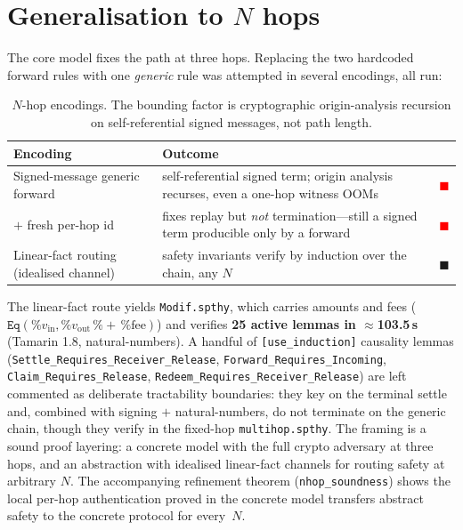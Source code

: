 \documentclass[11pt]{article}
\newcommand{\gc}{\textcolor{okgreen}{$\blacksquare$}}
\newcommand{\rc}{\textcolor{red}{$\blacksquare$}}
\begin{document}
\section{Generalisation to $N$ hops}

The core model fixes the path at three hops. Replacing the two hardcoded forward
rules with one \emph{generic} rule was attempted in several encodings, all run:

\begin{table}[h]
\centering
\small
\begin{tabular}{@{}p{4.9cm}p{7.4cm}c@{}}
\toprule
\textbf{Encoding} & \textbf{Outcome} & \\
\midrule
Signed-message generic forward & self-referential signed term; origin analysis recurses, even a one-hop witness OOMs & \rc \\
\;\; $+$ fresh per-hop id & fixes replay but \emph{not} termination---still a signed term producible only by a forward & \rc \\
Linear-fact routing (idealised channel) & safety invariants verify by induction over the chain, any $N$ & \gc \\
\bottomrule
\end{tabular}
\caption{$N$-hop encodings. The bounding factor is cryptographic
origin-analysis recursion on self-referential signed messages, not path length.}
\label{tab:nhop}
\end{table}

The linear-fact route yields \texttt{Modif.spthy}, which carries amounts
and fees ($\texttt{Eq}(\%v_\text{in},\%v_\text{out}\,\%{+}\,\%\text{fee})$) and
verifies \textbf{25 active lemmas in $\approx$103.5\,s} (Tamarin 1.8,
natural-numbers). A handful of \texttt{[use\_induction]} causality lemmas
(\texttt{Settle_Requires_Receiver_Release}, \texttt{Forward_Requires_Incoming},
\texttt{Claim_Requires_Release}, \texttt{Redeem_Requires_Receiver_Release}) are
left commented as deliberate tractability boundaries: they key on the terminal
settle and, combined with signing $+$ natural-numbers, do not terminate on the
generic chain, though they verify in the fixed-hop \texttt{multihop.spthy}. The
framing is a sound proof layering: a concrete model with the full crypto
adversary at three hops, and an abstraction with idealised linear-fact channels
for routing safety at arbitrary $N$. The accompanying refinement theorem
(\texttt{nhop_soundness}) shows the local per-hop authentication proved in the
concrete model transfers abstract safety to the concrete protocol for every~$N$.
\end{document}
